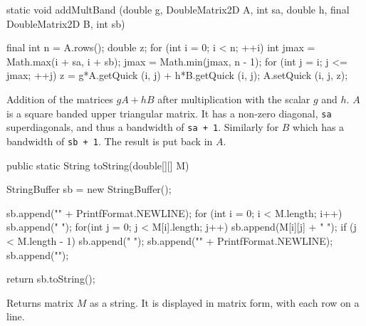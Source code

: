 \begin{hide}
\begin{code}
   static void addMultBand (double g, DoubleMatrix2D A, int sa,
                                   double h, final DoubleMatrix2D B, int sb) \begin{hide} {
      final int n = A.rows();
      double z;
      for (int i = 0; i < n; ++i) {
         int jmax = Math.max(i + sa, i + sb);
         jmax = Math.min(jmax, n - 1);
         for (int j = i; j <= jmax; ++j) {
            z = g*A.getQuick (i, j) + h*B.getQuick (i, j);
            A.setQuick (i, j, z);
         }
      }
   } \end{hide}
\end{code}
\begin{tabb} Addition of the matrices $gA + hB$ after multiplication with
the scalar $g$ and $h$. $A$ is a square banded upper triangular matrix.
It has a non-zero diagonal, \texttt{sa} superdiagonals, and thus a bandwidth
of \texttt{sa + 1}. Similarly for $B$ which has a bandwidth of \texttt{sb + 1}.
The result is put back in $A$.
\end{tabb}
\begin{htmlonly}
\end{htmlonly}
 \end{hide}
\begin{code}

   public static String toString(double[][] M) \begin{hide} {
      StringBuffer sb = new StringBuffer();

      sb.append("{" + PrintfFormat.NEWLINE);
      for (int i = 0; i < M.length; i++) {
         sb.append("   { ");
         for(int j = 0; j < M[i].length; j++) {
            sb.append(M[i][j] + " ");
            if (j < M.length - 1)
               sb.append(" ");
         }
         sb.append("}" + PrintfFormat.NEWLINE);
      }
      sb.append("}");

      return sb.toString();
   } \end{hide}
\end{code}
\begin{tabb} Returns matrix $M$ as a string.
It is displayed in matrix form, with each row on a line.
\end{tabb}
\begin{htmlonly}
\end{htmlonly}
